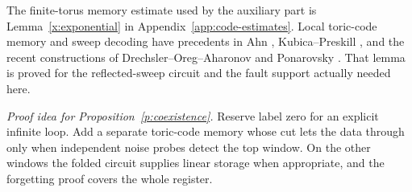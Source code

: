 The finite-torus memory estimate used by the auxiliary part is Lemma~\ref{x:exponential} in Appendix~\ref{app:code-estimates}. Local toric-code memory and sweep decoding have precedents in
Ahn \cite[Section~7.2 and Appendices~A\nobreakdash--B]{Ahn2004}, Kubica--Preskill
\cite{KubicaPreskill2019}, and the recent constructions of
Drechsler--Oreg--Aharonov and Ponarovsky \cite{DOA2026,Ponarovsky2026}.
That lemma is proved for the reflected-sweep circuit and the
fault support actually needed here.

\par\medskip\noindent\emph{Proof idea for Proposition~\ref{p:coexistence}.}
Reserve label zero for an explicit infinite loop. Add a separate toric-code memory whose cut lets the data through only when independent noise probes detect the top window. On the other windows the folded circuit supplies linear storage when appropriate, and the forgetting proof covers the whole register.

